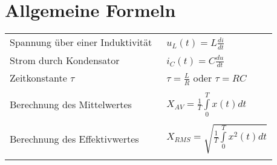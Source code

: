 \section{Allgemeine Formeln}

\begin{tabular}{ll}
  Spannung über einer Induktivität &\ $u_{L}(t) = L\frac{di}{dt}$\\
  Strom durch Kondensator &\ $i_{C}(t) = C\frac{du}{dt}$\\
  Zeitkonstante $\tau$ &\ $\tau = \frac{L}{R}$ oder $\tau = RC$\\\\
  Berechnung des Mittelwertes &\ $X_{AV} = \frac{1}{T}\int\limits_{0}^{T}x(t)dt$\\\\
  Berechnung des Effektivwertes &\ $X_{RMS} = \sqrt{\frac{1}{T}\int\limits_{0}^{T}x^2(t)dt}$\\\\
\end{tabular}